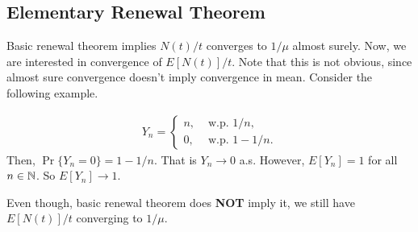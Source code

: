 \documentclass[a4paper,10pt, english]{article}
\begin{document}
\subsection{Elementary Renewal Theorem}
Basic renewal theorem implies $N(t)/t$ converges to $1/\mu$ almost surely. Now, we are interested in convergence of $E[N(t)]/t$. Note that this is not obvious, since almost sure convergence doesn't imply convergence in mean. Consider the following example.
\begin{exmp}
	\begin{align*}
	Y_n = \begin{cases}
	n, & \mbox{ w.p.  } 1/n,\\
	0, & \mbox{ w.p.  } 1- 1/n.
	\end{cases}
	\end{align*}
	Then, $\Pr\{ Y_n = 0 \} = 1 - 1/n$. %
	That is $Y_n \to 0$ a.s. However, $E[Y_n] = 1$ for all $n \in \mathbb{N}$. So $E[Y_n] \to 1$.
\end{exmp}
Even though, basic renewal theorem does \textbf{NOT} imply it, we still have $E[N(t)]/t$ converging to $1/\mu$.
\end{document}

